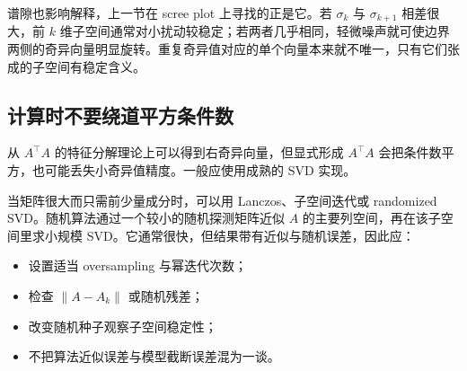 谱隙也影响解释，上一节在 scree plot 上寻找的正是它。若 \(\sigma_k\) 与 \(\sigma_{k+1}\) 相差很大，前 \(k\) 维子空间通常对小扰动较稳定；若两者几乎相同，轻微噪声就可使边界两侧的奇异向量明显旋转。重复奇异值对应的单个向量本来就不唯一，只有它们张成的子空间有稳定含义。

\subsection{计算时不要绕道平方条件数}

从 \(A^\top A\) 的特征分解理论上可以得到右奇异向量，但显式形成 \(A^\top A\) 会把条件数平方，也可能丢失小奇异值精度。一般应使用成熟的 SVD 实现。

当矩阵很大而只需前少量成分时，可以用 Lanczos、子空间迭代或 randomized SVD。随机算法通过一个较小的随机探测矩阵近似 \(A\) 的主要列空间，再在该子空间里求小规模 SVD。它通常很快，但结果带有近似与随机误差，因此应：

\begin{itemize}
\tightlist
\item
  设置适当 oversampling 与幂迭代次数；
\item
  检查 \(\|A-A_k\|\) 或随机残差；
\item
  改变随机种子观察子空间稳定性；
\item
  不把算法近似误差与模型截断误差混为一谈。
\end{itemize}
